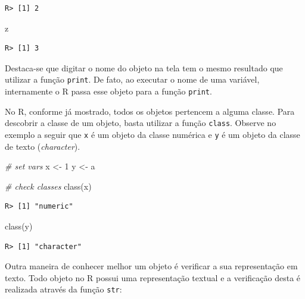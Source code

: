 \documentclass[
  11pt,
]{book}
\newenvironment{Shaded}{\begin{snugshade}}{\end{snugshade}}
\newcommand{\CommentTok}[1]{\textcolor[rgb]{0.37,0.37,0.37}{\textit{#1}}}
\newcommand{\DecValTok}[1]{\textcolor[rgb]{0.06,0.06,0.06}{#1}}
\newcommand{\FunctionTok}[1]{\textcolor[rgb]{0,0,0}{#1}}
\newcommand{\NormalTok}[1]{#1}
\newcommand{\OtherTok}[1]{\textcolor[rgb]{0.37,0.37,0.37}{#1}}
\newcommand{\StringTok}[1]{\textcolor[rgb]{0.5,0.5,0.5}{#1}}
\begin{document}
\begin{verbatim}
R> [1] 2
\end{verbatim}

\begin{Shaded}
\begin{Highlighting}[]
\NormalTok{z}
\end{Highlighting}
\end{Shaded}

\begin{verbatim}
R> [1] 3
\end{verbatim}

Destaca-se que digitar o nome do objeto na tela tem o mesmo resultado que utilizar a função \texttt{print}. De fato, ao executar o nome de uma variável, internamente o R passa esse objeto para a função \texttt{print}.

No R, conforme já mostrado, todos os objetos pertencem a alguma classe. Para descobrir a classe de um objeto, basta utilizar a função \texttt{class}. Observe no exemplo a seguir que \texttt{x} é um objeto da classe numérica e \texttt{y} é um objeto da classe de texto (\emph{character}). 

\begin{Shaded}
\begin{Highlighting}[]
\CommentTok{\# set vars}
\NormalTok{x }\OtherTok{\textless{}{-}} \DecValTok{1}
\NormalTok{y }\OtherTok{\textless{}{-}} \StringTok{\textquotesingle{}a\textquotesingle{}}

\CommentTok{\# check classes}
\FunctionTok{class}\NormalTok{(x)}
\end{Highlighting}
\end{Shaded}

\begin{verbatim}
R> [1] "numeric"
\end{verbatim}

\begin{Shaded}
\begin{Highlighting}[]
\FunctionTok{class}\NormalTok{(y)}
\end{Highlighting}
\end{Shaded}

\begin{verbatim}
R> [1] "character"
\end{verbatim}

Outra maneira de conhecer melhor um objeto é verificar a sua representação em texto. Todo objeto no R possui uma representação textual e a verificação desta é realizada através da função \texttt{str}: 
\end{document}
